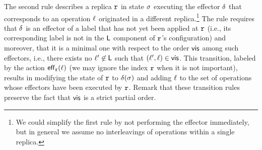 The second rule describes a replica $\mathtt{r}$ in state $\sigma$
executing the effector $\delta$ that corresponds to an operation
$\ell$ originated in a different replica.\footnote{We could
  simplify the first rule by not performing the effector immediately,
  but in general we assume no interleavings of operations within a
  single replica.}
The rule requires that $\delta$ is an effector of a label that has
not yet been applied at $\mathtt{r}$ (i.e., its corresponding label is not
in the $\mathsf{L}$ component of $\mathtt{r}$'s configuration) and
moreover, that it is a minimal one with respect to the order
$\mathsf{vis}$ among such effectors, i.e., there exists no
$\ell'\not\in \mathsf{L}$ such that $(\ell',\ell)\in
\mathsf{vis}$.
This transition, labeled by the action $\mathsf{eff}_{\mathtt{r}}(\ell)$ (we may
ignore the index $\mathtt{r}$ when it is not important), results in
modifying the state of $\mathtt{r}$ to $\delta(\sigma)$ and adding
$\ell$ to the set of operations whose effectors have been
executed by $\mathtt{r}$.
Remark that these transition rules preserve the fact that $\mathsf{vis}$
is a strict partial order.
%





